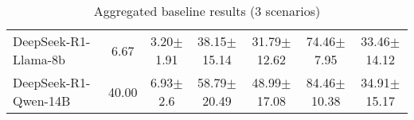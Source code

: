 \begin{table}[H]
\begin{tabular}{lcccccc}
    DeepSeek-R1-Llama-8b                                & 6.67                   & 3.20$\pm$\scriptsize{1.91}                   & 38.15$\pm$\scriptsize{15.14}                & 31.79$\pm$\scriptsize{12.62}                & 74.46$\pm$\scriptsize{7.95}              & 33.46$\pm$\scriptsize{14.12}                \\
    DeepSeek-R1-Qwen-14B                                & 40.00                   & 6.93$\pm$\scriptsize{2.6}                   & 58.79$\pm$\scriptsize{20.49}                & 48.99$\pm$\scriptsize{17.08}                & 84.46$\pm$\scriptsize{10.38}              & 34.91$\pm$\scriptsize{15.17}                \\ \hline
    \end{tabular}
    \caption{Aggregated baseline results (3 scenarios)}
    \label{tab:aggregated_baseline}
    \end{table}
    
